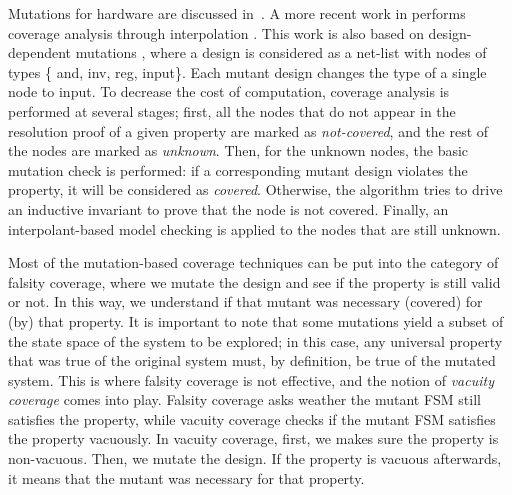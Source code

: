 \newcommand{\andnode}{{\sc and}}
\newcommand{\invnode}{{\sc inv}}
\newcommand{\inpnode}{{\sc inp}}
\newcommand{\regnode}{{\sc reg}}
\newcommand{\mutnode}{{\sc mut}}
\newcommand{\inputnode}{{\sc input}}

Mutations for hardware are discussed in~\cite{chockler2010coverage,Kupferman:2006:SCF,kupferman_theory_2008}. A more recent work in \cite{chockler2010coverage} performs coverage analysis through interpolation \cite{mcmillan2003interpolation}. This work is also based on design-dependent mutations \cite{chockler_coverage_2003}, where a design is considered as a net-list with nodes of types \{ \andnode, \invnode, \regnode, \inputnode \}.
Each mutant design changes the type of a single node to \inputnode . 
To decrease the cost of computation, coverage analysis is performed at several stages; first, all the nodes that do not appear in the resolution proof of a given property are marked as \emph{not-covered}, and the rest of the nodes are marked as \emph{unknown}. Then, for the unknown nodes, the basic mutation check is performed: if a corresponding mutant design violates the property, it will be considered as \emph{covered}. Otherwise, the algorithm tries to drive an inductive invariant to prove that the node is not covered. Finally, an interpolant-based model checking is applied to the nodes that are still unknown.

Most of the mutation-based coverage techniques can be put into the category of falsity coverage, where we mutate the design and see if the property is still valid or not.
In this way, we understand if that mutant was necessary (covered) for (by) that property.
It is important to note that some mutations yield a subset of the state space of the system to
be explored; in this case, any universal property that was true of the original system
must, by definition, be true of the mutated system. This is where falsity coverage is not effective, and the notion of \emph{vacuity coverage} comes into play. Falsity coverage asks weather the mutant FSM still satisfies the property, while vacuity coverage checks if the mutant FSM satisfies the property vacuously. In vacuity coverage, first, we makes sure the property is non-vacuous. Then, we mutate the design. If the property is
vacuous afterwards, it means that the mutant was necessary for that property.


